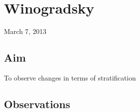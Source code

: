 \chapter{Winogradsky}
\begin{flushright}
March 7, 2013
\end{flushright}
\section{Aim}
	To observe changes in terms of stratification
\section{Observations}	

